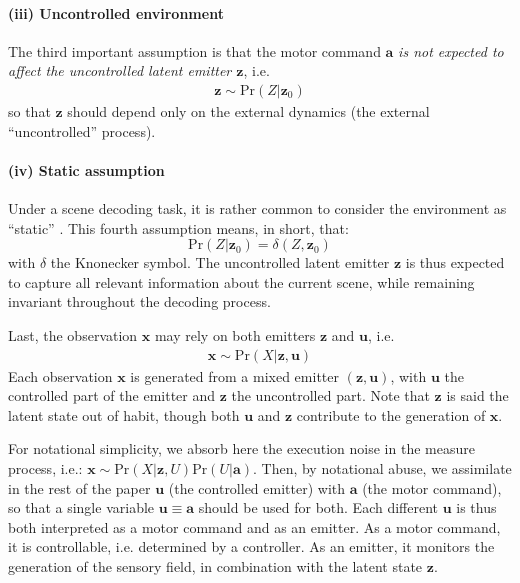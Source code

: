 \documentclass[12pt,twoside,openright]{article}
\begin{document}
\paragraph{(iii) Uncontrolled environment}
The third important assumption is that the motor command $\boldsymbol{a}$ \emph{is not expected to affect the uncontrolled latent emitter $\boldsymbol{z}$}, i.e.
\begin{align*}
\boldsymbol{z} \sim \text{Pr}(Z|\boldsymbol{z}_0)
\end{align*}
so that $\boldsymbol{z}$ should depend only on the external dynamics (the external ``uncontrolled'' process).

\paragraph{(iv) Static assumption}
Under a scene decoding  task, 
it is rather common to consider the environment as ``static'' \citep{butko2010infomax}. This fourth assumption means, in short, that:
$$\text{Pr}(Z|\boldsymbol{z}_0) = \delta(Z, \boldsymbol{z}_0)$$ 
with $\delta$ the Knonecker symbol. 
The uncontrolled latent emitter $\boldsymbol{z}$ is thus expected to capture all relevant information about the current scene, while remaining invariant throughout the decoding process.


Last, the observation $\boldsymbol{x}$ may rely on both emitters $\boldsymbol{z}$ and $\boldsymbol{u}$, i.e. 
\begin{align}
\boldsymbol{x} \sim \text{Pr}(X|\boldsymbol{z}, \boldsymbol{u})
\label{eq:gen}
\end{align} 
Each observation $\boldsymbol{x}$ is generated from a mixed emitter $(\boldsymbol{z}, \boldsymbol{u})$, with $\boldsymbol{u}$ the controlled part of the emitter and  $\boldsymbol{z}$ the uncontrolled part. Note that $\boldsymbol{z}$ is said the latent state out of habit, though both $\boldsymbol{u}$ and $\boldsymbol{z}$ contribute to the generation of $\boldsymbol{x}$.

For notational simplicity, we absorb here the execution noise \citep{van2004role} in the measure process, i.e.:
$\boldsymbol{x} \sim \text{Pr}(X|\boldsymbol{z}, U)\text{Pr}(U|\boldsymbol{a})$.
Then, by notational abuse, we assimilate in the rest of the paper  $\boldsymbol{u}$ (the controlled emitter) with $\boldsymbol{a}$ (the motor command), so that 
a single variable $\boldsymbol{u} \equiv \boldsymbol{a}$ should be used for both. 
Each different $\boldsymbol{u}$ is thus both interpreted as a
motor command and as an emitter. As a motor command, it is controllable, i.e. determined by a controller. As an emitter, it monitors the generation of the sensory field, in combination with the latent state $\boldsymbol{z}$. 
\end{document}
